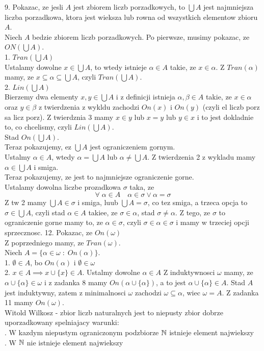\documentclass{article}
\begin{document}
\ttfamily
{\large\color{acc}9. Pokazac, ze jesli $A$ jest zbiorem liczb porzadkowych, to $\bigcup A$ jest najmniejsza liczba porzadkowa, ktora jest wieksza lub rowna od wszystkich elementow zbioru $A$.}\medskip\\
Niech $A$ bedzie zbiorem liczb porzadkowych. Po pierwsze, musimy pokazac, ze $ON(\bigcup A)$.\medskip\\
1. $Tran(\bigcup A)$\\
Ustalamy dowolne $x\in\bigcup A$, to wtedy istnieje $\alpha\in A$ takie, ze $x\in\alpha$. Z $Tran(\alpha)$ mamy, ze $x\subseteq \alpha\subseteq \bigcup A$, czyli $Tran(\bigcup A)$.\medskip\\
2. $Lin(\bigcup A)$\\
Bierzemy dwa elementy $x,y\in \bigcup A$ i z definicji istnieja $\alpha, \beta\in A$ takie, ze $x\in \alpha$ oraz $y\in \beta$ z twierdzenia z wykldu zachodzi $On(x)$ i $On(y)$ (czyli el liczb porz sa licz porz).  Z twierdznia 3 mamy $x\in y$ lub $x=y$ lub $y\in x$ i to jest dokladnie to, co chcelismy, czyli $Lin(\bigcup A)$.\medskip\\
Stad $On(\bigcup A)$.\medskip\\
Teraz pokazujemy, ez $\bigcup A$ jest ograniczeniem gornym.\\
Ustalmy $\alpha\in A$, wtedy $\alpha = \bigcup A$ lub $\alpha \neq \bigcup A$. Z twierdzenia 2 z wykladu mamy $\alpha\in\bigcup A$ i smiga.\\
Teraz pokazujemy, ze jest to najmniejsze ograniczenie gorne.\\
Ustalamy dowolna liczbe prozadkowa $\sigma$ taka, ze
$$\forall\;\alpha\in A\quad \alpha\in\sigma\lor\alpha=\sigma$$
Z tw 2 mamy $\bigcup A\in \sigma$ i smiga, luub $\bigcup A=\sigma$, co tez smiga, a trzeca opcja to $\sigma\in\bigcup A$, czyli stad $\alpha\in A$ takiee, ze $\sigma\in\alpha$, stad $\sigma\neq\alpha$. Z tego, ze $\sigma$ to ograniczenie gorne mamy to, ze $\alpha\in\sigma$, czyli $\sigma\in\alpha\in\sigma$ i mamy w trzeciej opcji sprzecznosc.
\kondow
{\large\color{acc}12. Pokazac, ze $On(\omega)$}\medskip\\
Z poprzedniego mamy, ze $Tran(\omega)$.\\
Niech $A=\{\alpha\in\omega\;:\;On(\alpha)\}$.\medskip\\
1. $\emptyset\in A$, bo $On(\alpha)$ i $\emptyset\in \omega$\medskip\\
2. $x\in A\implies x\cup\{x\}\in A$. Ustalmy dowolne $\alpha\in A$ Z induktywnosci $\omega$ mamy, ze $\alpha\cup\{\alpha\}\in \omega$ i z zadanka 8 mamy $On(\alpha\cup\{\alpha\})$, a to jest $\alpha\cup\{\alpha\}\in A$. Stad $A$ jest induktywny, zatem z minimalnosci $\omega$ zachodzi $\omega\subseteq\alpha$, wiec $\omega= A$. Z zadanka 11 mamy $On(\omega)$.
\kondow
{}\bigskip\\
Witold Wilkosz - zbior liczb naturalnych jest to niepusty zbior dobrze uporzadkowany spelniajacy warunki:\medskip\\
. W kazdym niepustym ograniczonym podzbiorze $\mathbb{N}$ istnieje element najwiekszy\\
. W $\mathbb{N}$ nie istnieje element najwiekszy\bigskip\\
\bigskip\\
\end{document}
